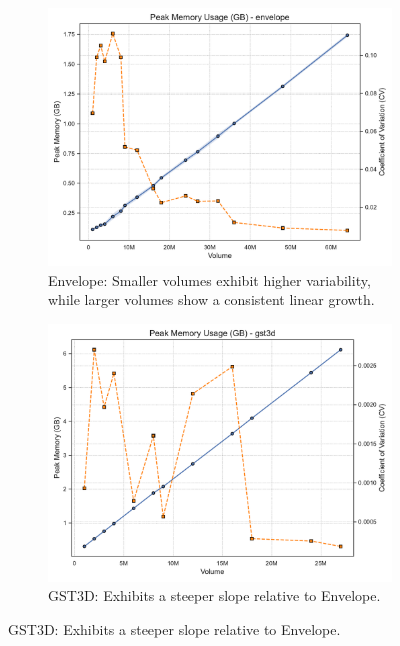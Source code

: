 \begin{figure}[htbp]
    \centering
    \begin{subfigure}[t]{0.49\textwidth}
        \centering
        \includegraphics[width=\textwidth]{assets/images/05/peak_memory_by_volume_envelope}
        \caption{Envelope: Smaller volumes exhibit higher variability,
            while larger volumes show a consistent linear growth.}
    \end{subfigure}
    \hfill
    \begin{subfigure}[t]{0.49\textwidth}
        \centering
        \includegraphics[width=\textwidth]{assets/images/05/peak_memory_by_volume_gst3d}
        \caption{\ac{GST3D}: Exhibits a steeper slope relative to Envelope.}

\end{subfigure}
\end{figure}
